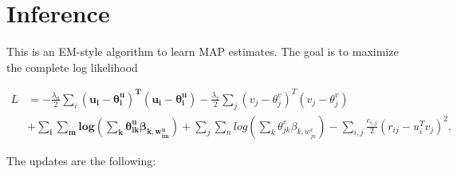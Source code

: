 \documentclass[12pt]{article}
\begin{document}
\section{Inference}
This is an EM-style algorithm to learn MAP estimates. The goal is to maximize the complete log likelihood

\begin{align*}
L &= - \frac{\lambda_u}{2} \sum_i \bm{(u_i - \theta^u_i)^T(u_i - \theta^u_i)} -\frac{\lambda_v}{2} \sum_j (v_j - \theta^v_j)^T(v_j - \theta^v_j) \\ 
& \bm{+ \sum_i \sum_m log( \sum_k \theta^u_{ik} \beta_{k,w^u_{im}})}  + \sum_j \sum_n log( \sum_k \theta^v_{jk} \beta_{k,w^v_{jn}}) - \sum_{i,j} \frac{c_{i,j}}{2} (r_{ij} - u^T_{i} v_{j})^2.
\end{align*}



The updates are the following:
\end{document}
